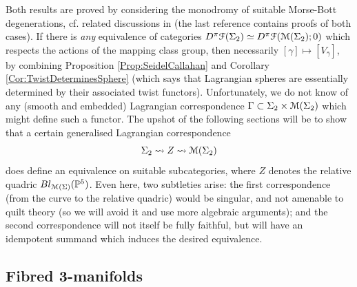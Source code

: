 \documentclass[reqno,10pt]{amsart}
\numberwithin{equation}{section}
\newcommand{\bP}{{\mathbb P}}
\newcommand{\scrF}{\EuScript{F}}
\newcommand{\scrM}{\EuScript{M}}
\theoremstyle{remark}
\begin{document}
Both results are proved by considering the monodromy of suitable Morse-Bott degenerations, cf. related discussions in \cite{Perutz, Seidel:Notes, WW:triangle} (the last reference contains proofs of both cases).   
  If there is \emph{any} equivalence of categories $D^{\pi}\scrF(\Sigma_2) \simeq D^{\pi}\scrF(\scrM(\Sigma_2);0)$ which respects the actions of the mapping class group, then necessarily $[\gamma] \mapsto [V_{\bar\gamma}]$, by combining Proposition \ref{Prop:SeidelCallahan} and Corollary \ref{Cor:TwistDeterminesSphere} (which says that Lagrangian spheres are essentially determined by their associated twist functors).  Unfortunately, we do not know of any (smooth and embedded) Lagrangian correspondence $\Gamma \subset \Sigma_2 \times \scrM(\Sigma_2)$ which might define such a functor.  The upshot of the following sections will be to show that a certain generalised Lagrangian correspondence
\[
\Sigma_2 \rightsquigarrow Z \rightsquigarrow  \scrM(\Sigma_2) 
\]
does define an equivalence on suitable subcategories, where $Z$ denotes the relative quadric $Bl_{\scrM(\Sigma)} (\bP^5)$.  Even here, two subtleties arise: the first correspondence (from the curve to the relative quadric) would be singular, and not amenable to quilt theory (so we will avoid it and use more algebraic arguments); and the second correspondence will not itself be fully faithful, but will have an idempotent summand which induces the desired equivalence.  


\subsection{Fibred 3-manifolds\label{Subsec:3manifolds}}
\end{document}
